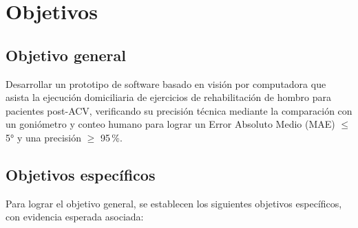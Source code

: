 \documentclass[11pt,a4paper]{article}
\begin{document}
\clearpage
{}
\section{Objetivos}

\subsection{Objetivo general}
Desarrollar un prototipo de software basado en visión por computadora que asista la ejecución domiciliaria de ejercicios de rehabilitación de hombro para pacientes post-ACV, verificando su precisión técnica mediante la comparación con un goniómetro y conteo humano para lograr un Error Absoluto Medio (MAE) $\leq$ 5° y una precisión $\geq$ 95\,\%.

\subsection{Objetivos específicos}
Para lograr el objetivo general, se establecen los siguientes objetivos específicos, con evidencia esperada asociada:
\end{document}
